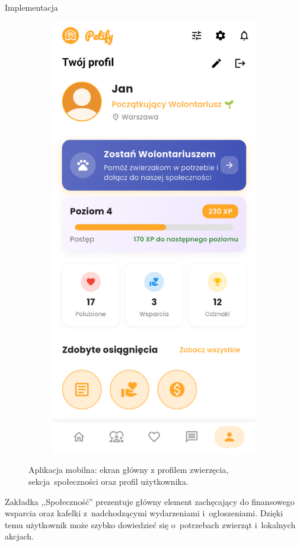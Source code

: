 \documentclass[final]{beamer} %
\begin{document}
\begin{frame}{}
\begin{columns}[T]
\begin{column}[T]{0.48\textwidth}
\begin{block}{Implementacja}
\begin{figure}[h]
\begin{subfigure}{0.325\textwidth}
    \includegraphics[width=\textwidth]{app-user.png}
\end{subfigure}
\caption{\centering Aplikacja mobilna: ekran główny z profilem zwierzęcia, sekcja~społeczności oraz profil użytkownika.}
\label{fig:example1}
\end{figure}
Zakładka ,,Społeczność'' prezentuje główny element zachęcający do finansowego wsparcia oraz kafelki z~nadchodzącymi wydarzeniami i~ogłoszeniami. Dzięki temu użytkownik może szybko dowiedzieć się o~potrzebach zwierząt i~lokalnych akcjach.


\end{block}
\end{column}
\end{columns}
\end{frame}
\end{document}
